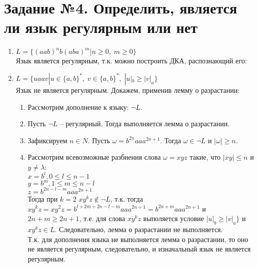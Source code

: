 \documentclass{article}
\begin{document}
\section{Задание №4. Определить, является ли язык
регулярным или нет}
\begin{enumerate}
    \item \(L = \{(aab)^{n}b(aba)^{m} | n \geq 0, \; m \geq 0\}\) \\
        Язык является регулярным, т.к. можно построить ДКА, распознающий его:
    \begin{center}
    \end{center}
    
    \item \(L = \{uaav | u \in \{a, b\}^*, \; v \in \{a, b\}^*, \; |u|_b \geq         |v|_a\}\) \\
        Язык не является регулярным. Докажем, применив лемму о разрастании:
    \begin{enumerate}
        \item Рассмотрим дополнение к языку: \(\neg L\).
        \item Пусть \(\neg L\) – регулярный. Тогда выполняется лемма о разрастании.
        \item Зафиксируем \(n \in N\). Пусть \(\omega = b^{2n}aaa^{2n + 1}\). Тогда \(\omega \in \neg L\) и \(|\omega| \geq n\).
        \item Рассмотрим всевозможные разбиения слова \(\omega = xyz\) такие, что \(|xy| \leq n\) и \(y \neq \lambda\):\\
        \(x = b^{l}, 0 \leq l \leq n - 1\)\\
        \(y = b^{m}, 1 \leq m \leq n - l\)\\
        \(z = b^{2n - l - m}aaa^{2n + 1}\)\\
        Тогда при \(k = 2\) \(xy^{k}z \notin \neg L\), т.к. тогда \(xy^{k}z = xy^{2}z = b^{l + 2m + 2n - l - m}aaa^{2n + 1} = b^{2n + m}aaa^{2n + 1}\) и \(2n + m \geq 2n + 1\), т.е. для слова \(xy^{k}z\) выполяется условие \(|u|_b \geq |v|_a\}\) и \(xy^{k}z \in L\). Следовательно, лемма о разрастании не выполняется.\\
        Т.к. для дополнения языка не выполняется лемма о разрастании, то оно не является регулярным, следовательно, и изначальный язык не является регулярным.
    \end{enumerate}
    

\end{enumerate}
\end{document}
